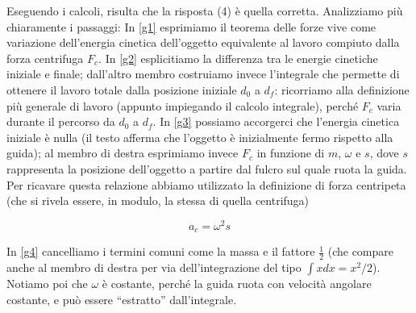 \noindent Eseguendo i calcoli, risulta che la risposta
(4) è quella corretta. Analizziamo più chiaramente i passaggi:
In \ref{g1} esprimiamo il teorema delle forze vive
come variazione dell'energia cinetica dell'oggetto
equivalente al lavoro compiuto dalla forza centrifuga $F_c$.
In \ref{g2} esplicitiamo la differenza tra le energie
cinetiche iniziale e finale; dall'altro membro costruiamo
invece l'integrale che permette di ottenere il lavoro
totale dalla posizione iniziale $d_0$ a $d_f$: ricorriamo
alla definizione più generale di lavoro (appunto impiegando
il calcolo integrale), perché $F_c$ varia durante il
percorso da $d_0$ a $d_f$. In \ref{g3} possiamo accorgerci
che l'energia cinetica iniziale è nulla (il testo afferma
che l'oggetto è inizialmente fermo rispetto alla guida);
al membro di destra esprimiamo invece $F_c$ in funzione
di $m$, $\omega$ e $s$, dove $s$ rappresenta la posizione
dell'oggetto a partire dal fulcro sul quale ruota la guida.
Per ricavare questa relazione
abbiamo utilizzato la definizione di forza centripeta
(che si rivela essere, in modulo, la stessa di quella
centrifuga)

\[ a_c = \omega^2 s \]

\noindent In \ref{g4} cancelliamo i termini comuni
come la massa e il fattore $\frac12$ (che compare
anche al membro di destra per via dell'integrazione
del tipo $\int xdx = x^2/2$). Notiamo poi che $\omega$
è costante, perché la guida ruota con velocità angolare
costante, e può essere ``estratto'' dall'integrale.